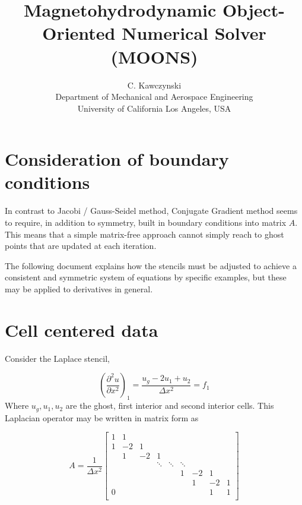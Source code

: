 \documentclass[landscape]{article}
\begin{document}
\doublespacing
\title{Magnetohydrodynamic Object-Oriented Numerical Solver (MOONS)}
\author{C. Kawczynski \\
Department of Mechanical and Aerospace Engineering \\
University of California Los Angeles, USA\\
}

\section{Consideration of boundary conditions}
In contrast to Jacobi / Gauss-Seidel method, Conjugate Gradient method seems to require, in addition to symmetry, built in boundary conditions into matrix $A$. This means that a simple matrix-free approach cannot simply reach to ghost points that are updated at each iteration.

The following document explains how the stencils must be adjusted to achieve a consistent and symmetric system of equations by specific examples, but these may be applied to derivatives in general.

\newpage
\section{Cell centered data}
Consider the Laplace stencil,

\begin{equation}
   \left(\frac{\partial^2 u}{\partial x^2}\right)_{1} = 
   \frac{u_g - 2 u_1 + u_{2}}{\Delta x^2} = f_1
\end{equation}
Where $u_g,u_1,u_2$ are the ghost, first interior and second interior cells. This Laplacian operator may be written in matrix form as

\[ A = \frac{1}{\Delta x^2} \left[\begin{array}{ccccccccc}
1  & 1     &           &           &           &           &           &         &    \\
1  & -2    & 1         &           &           &           &           &         &    \\
   & 1     & -2        & 1         &           &           &           &         &    \\
   &       &           & \ddots    & \ddots    & \ddots    &           &         &    \\
   &       &           &           &           & 1         & -2        & 1       &    \\
   &       &           &           &           &           &  1        & -2      &  1 \\
0  &       &           &           &           &           &           & 1       &  1 \\
\end{array} \right]
\]
\end{document}
